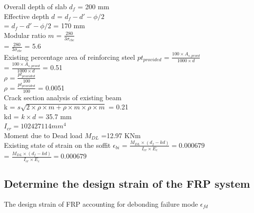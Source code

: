 \documentclass[12pt,a4paper]{article} %
\newcommand{\tab}{\hspace*{2em}} %
\begin{document}
\tab Overall depth of slab $d_f$ = 200 mm \\[8pt]

\tab Effective depth $d$ = $d_f - d' - \phi/2$ \\[8pt]
\tab\tab\tab\tab\tab = $d_f - d' - \phi/2$ = 170 mm \\[8pt]

\tab Modular ratio $m$ = $\frac{280}{3\sigma_{cbc}} $ \\[8pt]
\tab\tab\tab\tab\tab = $\frac{280}{3\sigma_{cbc}} $ = 5.6 \\[8pt]


\tab Existing percentage area of reinforcing steel $pt_{provided}$ = $\frac{100\times A_{s,provd}}{1000\times d}$ \\[8pt]
\tab\tab\tab\tab\tab = $\frac{100\times A_{s,provd}}{1000\times d}$ = 0.51 \\[8pt]

\tab\tab\tab\tab\tab $\rho$ = $\frac{pt_{provided}}{100}$ \\[8pt]
\tab\tab\tab\tab\tab $\rho$ = $\frac{pt_{provided}}{100}$ = 0.0051 \\[8pt]

\tab Crack section analysis of existing beam \\[8pt]
\tab\tab\tab\tab\tab k = $s\sqrt{{2 \times \rho \times m}+{ \rho \times m \times \rho \times m} }$ = 0.21 \\[8pt]
\tab\tab\tab\tab\tab kd = $k \times d$ = 35.7 mm \\[8pt]

\tab\tab\tab\tab\tab $I_{cr} = 102427114 mm^4$ \\[8pt]

\tab Moment due to Dead load $M_{DL}$ =12.97 KNm \\[8pt]

\tab Existing state of strain on the soffit $ \epsilon_{bi}$  = $\frac {M_{DL} \times ({d_f} - k d)}{I_{cr} \times E_c}  = 0.000679$ \\[8pt] 
\tab\tab\tab\tab\tab = $\frac {M_{DL} \times ({d_f} - k d)}{I_{cr} \times E_c}  = 0.000679$ \\[8pt] 

\subsection{Determine the design strain of the FRP system}

\tab The design strain of FRP accounting for debonding failure mode $ \epsilon_{fd} $ \\[8pt]
\end{document}
